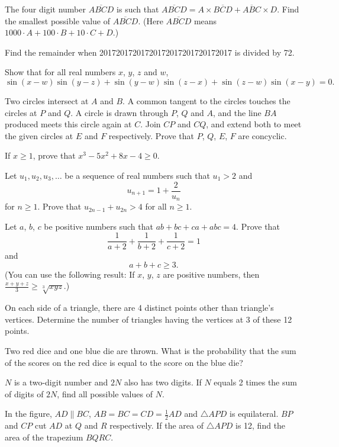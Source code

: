 \begin{problems}
    \problem The four digit number $\overline{ABCD}$ is such that
    $\overline{ABCD} = A \times \overline{BCD} + \overline{ABC} \times D$. Find
    the smallest possible value of $\overline{ABCD}$. (Here $\overline{ABCD}$
    means $1000 \cdot A + 100 \cdot B + 10 \cdot C + D$.)
    
    \problem Find the remainder when 20172017201720172017201720172017 is
    divided by 72. 
    
    \problem Show that for all real numbers $x$, $y$, $z$ and $w$, \[\sin(x -
    w)\sin(y - z) + \sin(y - w)\sin(z - x) + \sin(z - w)\sin(x - y) = 0.\]
    
    \problem Two circles intersect at $A$ and $B$. A common tangent to the
    circles touches the circles at $P$ and $Q$. A circle is drawn through $P$,
    $Q$ and $A$, and the line $BA$ produced meets this circle again at $C$.
    Join $CP$ and $CQ$, and extend both to meet the given circles at $E$ and
    $F$ respectively. Prove that $P$, $Q$, $E$, $F$ are concyclic. 
    
    \problem If $x \geq 1$, prove that $x^3 - 5x^2 + 8x - 4 \geq 0$. 
    
    \problem Let $u_{1}, u_{2}, u_{3}, \ldots$ be a sequence of real numbers
    such that $u_{1} > 2$ and 
    \[u_{n + 1} = 1 + \frac{2}{u_{n}}\] 
    for $n \geq 1$. Prove that $u_{2n - 1} + u_{2n} > 4$ for all $n \geq 1$. 
    
    \problem Let $a$, $b$, $c$ be positive numbers such that $ab + bc + ca +
    abc = 4$. Prove that 
    \[\frac{1}{a + 2} + \frac{1}{b + 2} + \frac{1}{c + 2} = 1\]
    and
    \[a + b + c \geq 3.\]
    (You can use the following result: If $x$, $y$, $z$ are positive numbers,
    then $\frac{x + y + z}{3} \geq \sqrt[3]{xyz}$.)
    
    \problem On each side of a triangle, there are 4 distinct points other than
    triangle's vertices. Determine the number of triangles having the vertices
    at 3 of these 12 points. 
    
    \problem Two red dice and one blue die are thrown. What is the probability
    that the sum of the scores on the red dice is equal to the score on the
    blue die? 
    
    \problem $N$ is a two-digit number and $2N$ also has two digits. If $N$
    equals 2 times the sum of digits of $2N$, find all possible values of $N$.
    
    \problem In the figure, $AD \parallel BC$, $AB = BC = CD = \frac{1}{2}AD$
    and $\triangle APD$ is equilateral. $BP$ and $CP$ cut $AD$ at $Q$ and $R$
    respectively. If the area of $\triangle APD$ is 12, find the area of the
    trapezium $BQRC$.
    

\end{problems}

